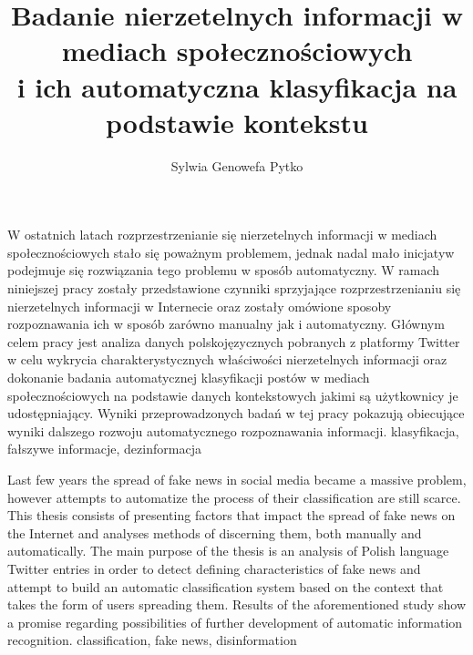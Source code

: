 \documentclass[
    left=2.5cm,         %
    right=2.5cm,        %
    top=2.5cm,          %
    bottom=3cm,         %
    bindingoffset=6mm,  %
    nohyphenation=false %
]{eiti/eiti-thesis}
\begin{document}
\MasterThesis %
{}
\title{
    Badanie nierzetelnych informacji w mediach społecznościowych\\ i ich automatyczna klasyfikacja na podstawie kontekstu
}
\author{Sylwia Genowefa Pytko}
\date{\the\year}
\maketitle

\cleardoublepage %
\streszczenie W ostatnich latach rozprzestrzenianie się nierzetelnych informacji w mediach społecznościowych stało się poważnym problemem, jednak nadal mało inicjatyw podejmuje się rozwiązania tego problemu w sposób automatyczny. W ramach niniejszej pracy zostały przedstawione czynniki sprzyjające rozprzestrzenianiu się nierzetelnych informacji w Internecie oraz zostały omówione sposoby rozpoznawania ich w sposób zarówno manualny jak i automatyczny. Głównym celem pracy jest analiza danych polskojęzycznych pobranych z platformy Twitter w celu wykrycia charakterystycznych właściwości nierzetelnych informacji oraz dokonanie badania automatycznej klasyfikacji postów w mediach społecznościowych na podstawie danych kontekstowych jakimi są użytkownicy je udostępniający. Wyniki przeprowadzonych badań w tej pracy pokazują obiecujące wyniki dalszego rozwoju automatycznego rozpoznawania informacji.
\slowakluczowe klasyfikacja, fałszywe informacje, dezinformacja

\newpage
\abstract Last few years the spread of fake news in social media became a massive problem, however attempts to automatize the process of their classification are still scarce. This thesis consists of presenting factors that impact the spread of fake news on the Internet and analyses methods of discerning them, both manually and automatically. The main purpose of the thesis is an analysis of Polish language Twitter entries in order to detect defining characteristics of fake news and attempt to build an automatic classification system based on the context that takes the form of users spreading them. Results of the aforementioned study show a promise regarding possibilities of further development of automatic information recognition.
\keywords classification, fake news, disinformation
\end{document}
